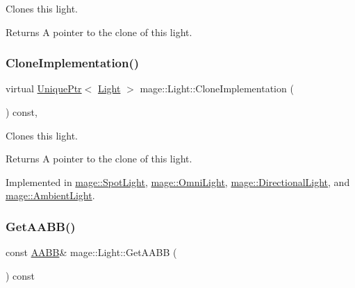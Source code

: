 Clones this light.

\begin{DoxyReturn}{Returns}
A pointer to the clone of this light. 
\end{DoxyReturn}
\hypertarget{classmage_1_1_light_aa613d76a1ebda69efde853d15f75490c}{}\label{classmage_1_1_light_aa613d76a1ebda69efde853d15f75490c} 
\subsubsection{\texorpdfstring{Clone\+Implementation()}{CloneImplementation()}}
{\footnotesize\ttfamily virtual \hyperlink{namespacemage_a3316d7143a973e37adf1110f2e80ca31}{Unique\+Ptr}$<$ \hyperlink{classmage_1_1_light}{Light} $>$ mage\+::\+Light\+::\+Clone\+Implementation (\begin{DoxyParamCaption}{ }\end{DoxyParamCaption}) const\hspace{0.3cm}{\ttfamily [private]}, {}}

Clones this light.

\begin{DoxyReturn}{Returns}
A pointer to the clone of this light. 
\end{DoxyReturn}


Implemented in \hyperlink{classmage_1_1_spot_light_a060044ae1de97143878ad26524f03709}{mage\+::\+Spot\+Light}, \hyperlink{classmage_1_1_omni_light_a1212457828cdd96cc7170767b7bd1223}{mage\+::\+Omni\+Light}, \hyperlink{classmage_1_1_directional_light_a122d3dcd7633a85ef8a85e7d768da36d}{mage\+::\+Directional\+Light}, and \hyperlink{classmage_1_1_ambient_light_a7223a4770653c20e662810b0956c6e51}{mage\+::\+Ambient\+Light}.

\hypertarget{classmage_1_1_light_a1ce1d4a97857b182e629e0e546beb280}{}\label{classmage_1_1_light_a1ce1d4a97857b182e629e0e546beb280} 
\subsubsection{\texorpdfstring{Get\+A\+A\+B\+B()}{GetAABB()}}
{\footnotesize\ttfamily const \hyperlink{structmage_1_1_a_a_b_b}{A\+A\+BB}\& mage\+::\+Light\+::\+Get\+A\+A\+BB (\begin{DoxyParamCaption}{ }\end{DoxyParamCaption}) const\hspace{0.3cm}{\ttfamily [noexcept]}}

